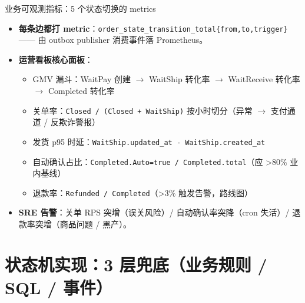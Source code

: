 \documentclass[aspectratio=169,11pt]{beamer}
\begin{document}
\begin{frame}[shrink]{业务可观测指标：5 个状态切换的 metrics}
\begin{itemize}
  \item \textbf{每条边都打 metric}：\texttt{order\_state\_transition\_total\{from,to,trigger\}} —— 由 outbox publisher 消费事件落 Prometheus。
  \item \textbf{运营看板核心面板}：
  \begin{itemize}
    \item GMV 漏斗：WaitPay 创建 $\to$ WaitShip 转化率 $\to$ WaitReceive 转化率 $\to$ Completed 转化率
    \item 关单率：\texttt{Closed / (Closed + WaitShip)} 按小时切分（异常 $\to$ 支付通道 / 反欺诈警报）
    \item 发货 p95 时延：\texttt{WaitShip.updated\_at - WaitShip.created\_at}
    \item 自动确认占比：\texttt{Completed.Auto=true / Completed.total}（应 >80\% 业内基线）
    \item 退款率：\texttt{Refunded / Completed}（>3\% 触发告警，路线图）
  \end{itemize}
  \item \textbf{SRE 告警}：关单 RPS 突增（误关风险）/ 自动确认率突降（cron 失活）/ 退款率突增（商品问题 / 黑产）。
\end{itemize}
\end{frame}

\section{状态机实现：3 层兜底（业务规则 / SQL / 事件）}
\end{document}

